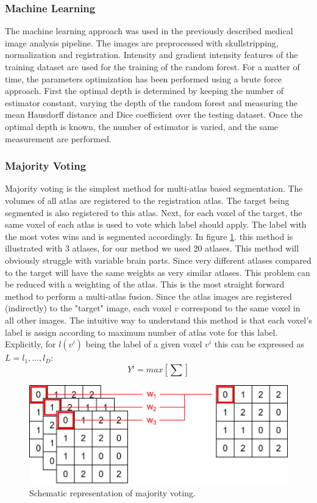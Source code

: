 \subsubsection*{Machine Learning}
The machine learning approach was used in the previously described medical image analysis pipeline. The images are preprocessed with skullstripping, normalization and registration. Intensity and gradient intensity features of the training dataset are used for the training of the random forest. 
For a matter of time, the parameters optimization has been performed using a brute force approach. First the optimal depth is determined by keeping the number of estimator constant, varying the depth of the random forest and measuring the mean Hausdorff distance and Dice coefficient over the testing dataset. Once the optimal depth is known, the number of estimator is varied, and the same measurement are performed.

\subsubsection*{Majority Voting}
Majority voting is the simplest method for multi-atlas based segmentation. The volumes of all atlas are registered to the registration atlas. The target being segmented is also registered to this atlas. Next, for each voxel of the target, the same voxel of each atlas is used to vote which label should apply. The label with the most votes wins and is segmented accordingly. In figure \ref{fig:majorityVoting}. this method is illustrated with 3 atlases, for our method we used 20 atlases. This method will obviously struggle with variable brain parts. Since very different atlases compared to the target will have the same weights as very similar atlases. This problem can be reduced with a weighting of the atlas.
This is the most straight forward method to perform a multi-atlas fusion. Since the atlas images are registered (indirectly) to the "target" image, each voxel $v$ correspond to the same voxel in all other images. The intuitive way to understand this method is that each voxel's label is assign according to maximum number of atlas vote for this label. Explicitly, for $l(v^{i})$ being the label of a given voxel $v^{i}$ this can be expressed as $L={l_1, ... , l_D}$:
\[ Y^{i}=max[\sum{}] \]


\begin{figure}[h!]
	\centering
	\includegraphics[width=0.8\linewidth]{img/majorityVoting2}
	\caption{Schematic representation of majority voting.}
	\label{fig:majorityVoting}
\end{figure}

